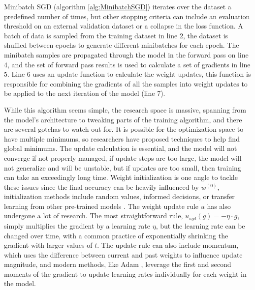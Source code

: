 Minibatch SGD (algorithm \ref{alg:MinibatchSGD}) iterates over the dataset a predefined number of times, but other stopping criteria can include an evaluation threshold on an external validation dataset or a collapse in the loss function.
A batch of data is sampled from the training dataset in line 2, the dataset is shuffled between epochs to generate different minibatches for each epoch.
The minibatch samples are propagated through the model in the forward pass on line 4, and the set of forward pass results is used to calculate a set of gradients in line 5. 
Line 6 uses an update function to calculate the weight updates, this function is responsible for combining the gradients of all the samples into weight updates to be applied to the next iteration of the model (line 7).

While this algorithm seems simple, the research space is massive, spanning from the model's architecture to tweaking parts of the training algorithm, and there are several gotchas to watch out for.
It is possible for the optimization space to have multiple minimums, so researchers have proposed techniques to help find global minimums. 
The update calculation is essential, and the model will not converge if not properly managed, if update steps are too large, the model will not generalize and will be unstable, but if updates are too small, then training can take an exceedingly long time.
Weight initialization is one angle to tackle these issues since the final accuracy can be heavily influenced by $w^{(0)}$, initialization methods include random values, informed decisions, or transfer learning from other pre-trained models \cite{Glorot2010XavierInitalization}.
The weight update rule $u$ has also undergone a lot of research.
The most straightforward rule, $u_{sgd}(g)=-\eta \cdot g$, simply multiplies the gradient by a learning rate $\eta$, but the learning rate can be changed over time, with a common practice of exponentially shrinking the gradient with larger values of $t$.
The update rule can also include momentum, which uses the difference between current and past weights to influence update magnitude, and modern methods, like Adam \cite{Kingma2015Adam}, leverage the first and second moments of the gradient to update learning rates individually for each weight in the model.

